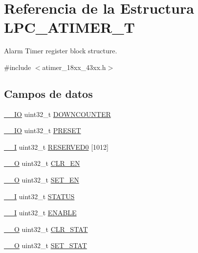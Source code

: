 \hypertarget{struct_l_p_c___a_t_i_m_e_r___t}{}\section{Referencia de la Estructura L\+P\+C\+\_\+\+A\+T\+I\+M\+E\+R\+\_\+T}
\label{struct_l_p_c___a_t_i_m_e_r___t}


Alarm Timer register block structure.  




{\ttfamily \#include $<$atimer\+\_\+18xx\+\_\+43xx.\+h$>$}

\subsection*{Campos de datos}
\begin{DoxyCompactItemize}
\item 
\hyperlink{core__sc300_8h_aec43007d9998a0a0e01faede4133d6be}{\+\_\+\+\_\+\+IO} uint32\+\_\+t \hyperlink{struct_l_p_c___a_t_i_m_e_r___t_a48003e5438dd389da34f3775ae2d1737}{D\+O\+W\+N\+C\+O\+U\+N\+T\+ER}
\item 
\hyperlink{core__sc300_8h_aec43007d9998a0a0e01faede4133d6be}{\+\_\+\+\_\+\+IO} uint32\+\_\+t \hyperlink{struct_l_p_c___a_t_i_m_e_r___t_a0d1aa425e85140fab9caba063ae0b5fa}{P\+R\+E\+S\+ET}
\item 
\hyperlink{core__sc300_8h_af63697ed9952cc71e1225efe205f6cd3}{\+\_\+\+\_\+I} uint32\+\_\+t \hyperlink{struct_l_p_c___a_t_i_m_e_r___t_aa30fe60f09b5291251c6166bca12b9aa}{R\+E\+S\+E\+R\+V\+E\+D0} \mbox{[}1012\mbox{]}
\item 
\hyperlink{core__sc300_8h_a7e25d9380f9ef903923964322e71f2f6}{\+\_\+\+\_\+O} uint32\+\_\+t \hyperlink{struct_l_p_c___a_t_i_m_e_r___t_a0d317a6488644b87e17e5f559c08289f}{C\+L\+R\+\_\+\+EN}
\item 
\hyperlink{core__sc300_8h_a7e25d9380f9ef903923964322e71f2f6}{\+\_\+\+\_\+O} uint32\+\_\+t \hyperlink{struct_l_p_c___a_t_i_m_e_r___t_ad4ee2600dffc97b5487b479978433ed0}{S\+E\+T\+\_\+\+EN}
\item 
\hyperlink{core__sc300_8h_af63697ed9952cc71e1225efe205f6cd3}{\+\_\+\+\_\+I} uint32\+\_\+t \hyperlink{struct_l_p_c___a_t_i_m_e_r___t_aece2c880dc5ba01a2fc9326dc080dc26}{S\+T\+A\+T\+US}
\item 
\hyperlink{core__sc300_8h_af63697ed9952cc71e1225efe205f6cd3}{\+\_\+\+\_\+I} uint32\+\_\+t \hyperlink{struct_l_p_c___a_t_i_m_e_r___t_a92c23e9b88593bf89218d85da0c67585}{E\+N\+A\+B\+LE}
\item 
\hyperlink{core__sc300_8h_a7e25d9380f9ef903923964322e71f2f6}{\+\_\+\+\_\+O} uint32\+\_\+t \hyperlink{struct_l_p_c___a_t_i_m_e_r___t_a2736f94695ea3082afc55537cc4172b4}{C\+L\+R\+\_\+\+S\+T\+AT}
\item 
\hyperlink{core__sc300_8h_a7e25d9380f9ef903923964322e71f2f6}{\+\_\+\+\_\+O} uint32\+\_\+t \hyperlink{struct_l_p_c___a_t_i_m_e_r___t_aa392d0314798880efcc1243457aad369}{S\+E\+T\+\_\+\+S\+T\+AT}
\end{DoxyCompactItemize}


